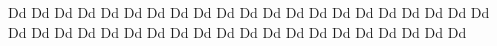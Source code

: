 \documentclass{worksheet}
\begin{document}
\begin{drillsheet}
\calligra
Dd Dd Dd Dd Dd Dd Dd Dd Dd Dd Dd Dd Dd Dd Dd Dd Dd Dd Dd Dd Dd Dd Dd Dd Dd Dd Dd Dd Dd Dd Dd Dd Dd Dd Dd Dd Dd Dd Dd Dd Dd
\end{drillsheet}
\end{document}

